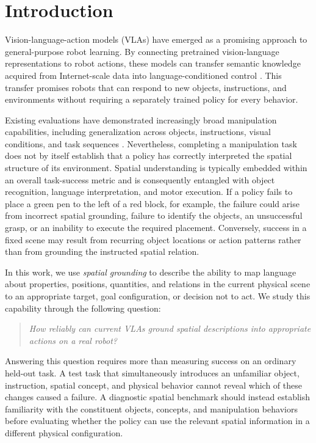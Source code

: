 \documentclass[conference]{IEEEtran}
\begin{document}
\section{Introduction}

Vision-language-action models (VLAs) have emerged as a promising approach to general-purpose robot learning. By connecting pretrained vision-language representations to robot actions, these models can transfer semantic knowledge acquired from Internet-scale data into language-conditioned control \cite{brohan2023rt2,black2025pi05,nvidia2025gr00t,fang2026molmoact2}. This transfer promises robots that can respond to new objects, instructions, and environments without requiring a separately trained policy for every behavior.

Existing evaluations have demonstrated increasingly broad manipulation capabilities, including generalization across objects, instructions, visual conditions, and task sequences \cite{zhang2024vlabench,zhou2025liberopro,gao2026stargen}. Nevertheless, completing a manipulation task does not by itself establish that a policy has correctly interpreted the spatial structure of its environment. Spatial understanding is typically embedded within an overall task-success metric and is consequently entangled with object recognition, language interpretation, and motor execution. If a policy fails to place a green pen to the left of a red block, for example, the failure could arise from incorrect spatial grounding, failure to identify the objects, an unsuccessful grasp, or an inability to execute the required placement. Conversely, success in a fixed scene may result from recurring object locations or action patterns rather than from grounding the instructed spatial relation.

In this work, we use \emph{spatial grounding} to describe the ability to map language about properties, positions, quantities, and relations in the current physical scene to an appropriate target, goal configuration, or decision not to act. We study this capability through the following question:

\begin{quote}
\emph{How reliably can current VLAs ground spatial descriptions into appropriate actions on a real robot?}
\end{quote}

Answering this question requires more than measuring success on an ordinary held-out task. A test task that simultaneously introduces an unfamiliar object, instruction, spatial concept, and physical behavior cannot reveal which of these changes caused a failure. A diagnostic spatial benchmark should instead establish familiarity with the constituent objects, concepts, and manipulation behaviors before evaluating whether the policy can use the relevant spatial information in a different physical configuration.
\end{document}
